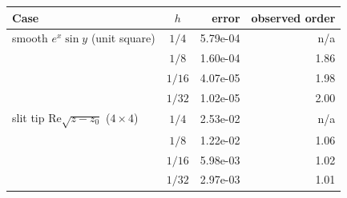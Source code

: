 \begin{tabular}{@{}l c r r@{}}
\toprule
Case & $h$ & error & observed order \\
\midrule
smooth $e^x\sin y$ (unit square) & $1/4$ & 5.79e-04 & n/a \\
 & $1/8$ & 1.60e-04 & 1.86 \\
 & $1/16$ & 4.07e-05 & 1.98 \\
 & $1/32$ & 1.02e-05 & 2.00 \\
\midrule
slit tip $\mathrm{Re}\sqrt{z-z_0}$ ($4\times4$) & $1/4$ & 2.53e-02 & n/a \\
 & $1/8$ & 1.22e-02 & 1.06 \\
 & $1/16$ & 5.98e-03 & 1.02 \\
 & $1/32$ & 2.97e-03 & 1.01 \\
\bottomrule
\end{tabular}
